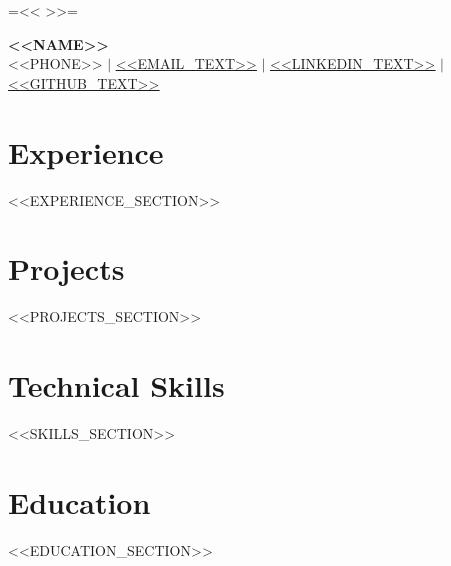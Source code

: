 \documentclass[letterpaper,11pt]{article}
\begin{document}
{{=<< >>=}}

\begin{center}
  \textbf{\LARGE <<NAME>>} \\ \vspace{1pt}
  \small <<PHONE>> $|$ \href{<<EMAIL_HREF>>}{\underline{<<EMAIL_TEXT>>}} $|$
  \href{<<LINKEDIN_HREF>>}{\underline{<<LINKEDIN_TEXT>>}} $|$
  \href{<<GITHUB_HREF>>}{\underline{<<GITHUB_TEXT>>}}
\end{center}

\section{Experience}
  <<EXPERIENCE_SECTION>>

\section{Projects}
  <<PROJECTS_SECTION>>

\section{Technical Skills}
  <<SKILLS_SECTION>>

\section{Education}

  <<EDUCATION_SECTION>>
\end{document}
